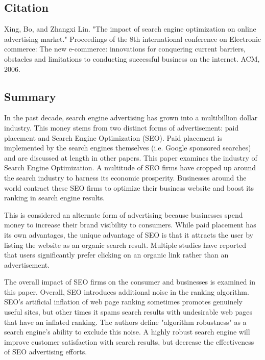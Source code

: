 \documentclass[../summaries.tex]{subfiles}
\begin{document}
\subsection{Citation}
Xing, Bo, and Zhangxi Lin. "The impact of search engine optimization on online advertising market." Proceedings of the 8th international conference on Electronic commerce: The new e-commerce: innovations for conquering current barriers, obstacles and limitations to conducting successful business on the internet. ACM, 2006.

\subsection{Summary}
In the past decade, search engine advertising has grown into a multibillion dollar industry. This money stems from two distinct forms of advertisement:  paid placement and Search Engine Optimization (SEO). Paid placement is implemented by the search engines themselves (i.e. Google sponsored searches) and are discussed at length in other papers. This paper examines the industry of Search Engine Optimization. A multitude of SEO firms have cropped up around the search industry to harness its economic prosperity. Businesses around the world contract these SEO firms to optimize their business website and boost its ranking in search engine results.

This is considered an alternate form of advertising because businesses spend money to increase their brand visibility to consumers. While paid placement has its own advantages, the unique advantage of SEO is that it attracts the user by listing the website as an organic search result. Multiple studies have reported that users significantly prefer clicking on an organic link rather than an advertisement.

The overall impact of SEO firms on the consumer and businesses is examined in this paper. Overall, SEO introduces additional noise in the ranking algorithm. SEO's artificial inflation of web page ranking sometimes promotes genuinely useful sites, but other times it spams search results with undesirable web pages that have an inflated ranking. The authors define "algorithm robustness" as a search engine's ability to exclude this noise. A highly robust search engine will improve customer satisfaction with search results, but decrease the effectiveness of SEO advertising efforts.
\end{document}
